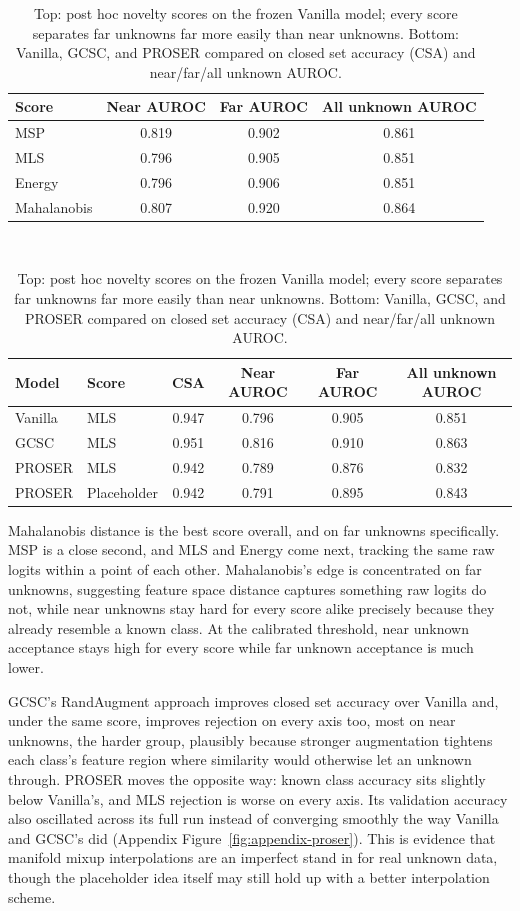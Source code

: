 \documentclass{article}
\begin{document}
\begin{table}[!htb]
  \centering
  \small
  \begin{tabular}{lccc}
    \toprule
    Score & Near AUROC & Far AUROC & All unknown AUROC \\
    \midrule
    MSP          & 0.819 & 0.902 & 0.861 \\
    MLS          & 0.796 & 0.905 & 0.851 \\
    Energy       & 0.796 & 0.906 & 0.851 \\
    Mahalanobis  & 0.807 & 0.920 & 0.864 \\
    \bottomrule
  \end{tabular}
  \\[6pt]
  \begin{tabular}{llcccc}
    \toprule
    Model & Score & CSA & Near AUROC & Far AUROC & All unknown AUROC \\
    \midrule
    Vanilla & MLS         & 0.947 & 0.796 & 0.905 & 0.851 \\
    GCSC    & MLS         & 0.951 & 0.816 & 0.910 & 0.863 \\
    PROSER  & MLS         & 0.942 & 0.789 & 0.876 & 0.832 \\
    PROSER  & Placeholder & 0.942 & 0.791 & 0.895 & 0.843 \\
    \bottomrule
  \end{tabular}
  \vspace{8pt}
  \caption{Top: post hoc novelty scores on the frozen Vanilla model; every
  score separates far unknowns far more easily than near unknowns. Bottom:
  Vanilla, GCSC, and PROSER compared on closed set accuracy (CSA) and
  near/far/all unknown AUROC.}
  \label{tab:task4-scores}
  \label{tab:task4-methods}
\end{table}

Mahalanobis distance is the best score overall, and on far unknowns
specifically. MSP is a close second, and MLS and Energy come next,
tracking the same raw logits within a point of each other. Mahalanobis's
edge is concentrated on far unknowns, suggesting feature space distance
captures something raw logits do not, while near unknowns stay hard for
every score alike precisely because they already resemble a known class.
At the calibrated threshold, near unknown acceptance stays high for every
score while far unknown acceptance is much lower.

GCSC's RandAugment approach improves closed set accuracy over
Vanilla and, under the same score, improves rejection on every axis too,
most on near unknowns, the harder group, plausibly because stronger
augmentation tightens each class's feature region where similarity would
otherwise let an unknown through. PROSER moves the opposite way:
known class accuracy sits slightly below Vanilla's, and MLS rejection is
worse on every axis. Its validation accuracy also oscillated across its
full run instead of converging smoothly the way Vanilla and GCSC's did
(Appendix Figure~\ref{fig:appendix-proser}). This is evidence that
manifold mixup interpolations are an imperfect stand in for real unknown
data, though the placeholder idea itself may still hold up with a better
interpolation scheme.
\end{document}
